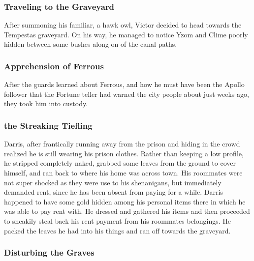 \subsubsection{Traveling to the Graveyard}

After summoning his familiar, a hawk owl, Victor decided to head towards the Tempestas graveyard. On his way, he managed to notice Yzom and Clime poorly hidden between some bushes along on of the canal paths. 

\subsubsection{Apprehension of Ferrous}

After the guards learned about Ferrous, and how he must have been the Apollo follower that the Fortune teller had warned the city people about just weeks ago, they took him into custody. 

\subsubsection{the Streaking Tiefling}

Darris, after frantically running away from the prison and hiding in the crowd realized he is still wearing his prison clothes. Rather than keeping a low profile, he stripped completely naked, grabbed some leaves from the ground to cover himself, and ran back to where his home was across town. His roommates were not super shocked as they were use to his shenanigans, but immediately demanded rent, since he has been absent from paying for a while. Darris happened to have some gold hidden among his personal items there in which he was able to pay rent with. He dressed and gathered his items and then proceeded to sneakily steal back his rent payment from his roommates belongings. He packed the leaves he had into his things and ran off towards the graveyard.

\subsubsection{Disturbing the Graves}


